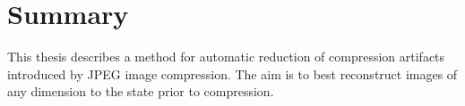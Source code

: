 \chapter{Summary}
This thesis describes a method for automatic reduction of compression artifacts introduced by JPEG image compression. The aim is to best reconstruct images of any dimension to the state prior to compression. 